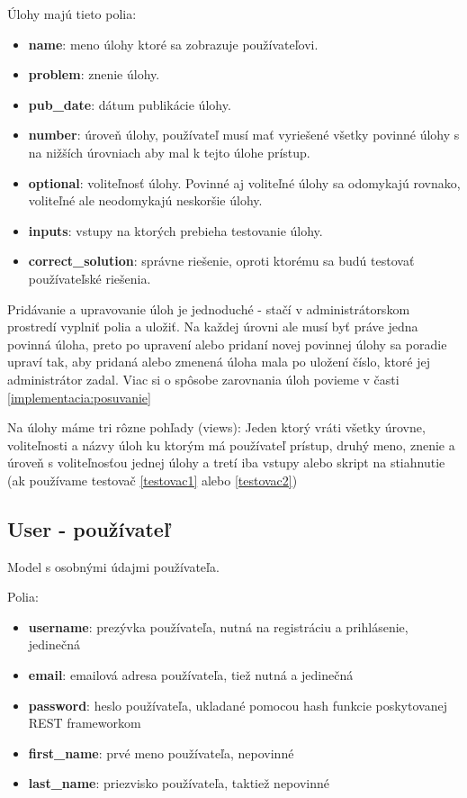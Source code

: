Úlohy majú tieto polia:
\begin{itemize}
\itemsep0em
\item \textbf{name}: meno úlohy ktoré sa zobrazuje používateľovi.
\item \textbf{problem}: znenie úlohy.
\item \textbf{pub\_date}: dátum publikácie úlohy.
\item \textbf{number}: úroveň úlohy, používateľ musí mať vyriešené všetky povinné úlohy s
  na nižších úrovniach aby mal k tejto úlohe prístup.
\item \textbf{optional}: voliteľnosť úlohy. Povinné aj voliteľné úlohy sa odomykajú rovnako, voliteľné
   ale neodomykajú neskoršie úlohy.
\item \textbf{inputs}: vstupy na ktorých prebieha testovanie úlohy.
\item \textbf{correct\_solution}: správne riešenie, oproti ktorému sa budú testovať používateľské
   riešenia.
\end{itemize}

Pridávanie a upravovanie úloh je jednoduché - stačí v administrátorskom prostredí vyplniť polia
a uložiť. Na každej úrovni ale musí byť práve jedna povinná úloha, preto po upravení
alebo pridaní novej povinnej úlohy sa poradie upraví tak, aby pridaná alebo zmenená úloha mala
po uložení číslo, ktoré jej administrátor zadal. Viac si o spôsobe zarovnania úloh povieme v časti
\ref{implementacia:posuvanie}

Na úlohy máme tri rôzne pohľady (views): Jeden ktorý vráti všetky úrovne, voliteľnosti a názvy úloh ku ktorým má
používateľ prístup, druhý meno, znenie a úroveň s voliteľnosťou jednej úlohy a tretí
iba vstupy alebo skript na stiahnutie (ak používame testovač \ref{testovac1} alebo \ref{testovac2})

\subsection{User - používateľ}
Model s osobnými údajmi používateľa.

Polia:
\begin{itemize}
\item \textbf{username}: prezývka používateľa, nutná na registráciu a prihlásenie, jedinečná
\item \textbf{email}: emailová adresa používateľa, tiež nutná a jedinečná
\item \textbf{password}: heslo používateľa, ukladané pomocou hash funkcie poskytovanej
                        REST frameworkom
\item \textbf{first\_name}: prvé meno používateľa, nepovinné
\item \textbf{last\_name}: priezvisko používateľa, taktiež nepovinné
\end{itemize}

